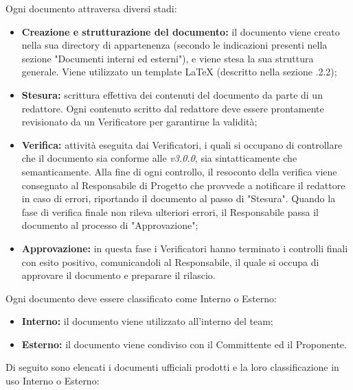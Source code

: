       Ogni documento attraversa diversi stadi:
      \begin{itemize}
        \item \textbf{Creazione e strutturazione del documento:} il documento viene creato nella sua directory di appartenenza (secondo le indicazioni presenti nella sezione "Documenti interni ed esterni"), e viene stesa la sua struttura generale. Viene utilizzato un template \LaTeX{} (descritto nella sezione .2.2);

        \item \textbf{Stesura:} scrittura effettiva dei contenuti del documento da parte di un redattore. Ogni contenuto scritto dal redattore deve essere prontamente revisionato da un Verificatore per garantirne la validità;

        \item \textbf{Verifica:} attività eseguita dai Verificatori, i quali si occupano di controllare che il documento sia conforme alle
        \textit{\NdP{} v3.0.0}, sia sintatticamente che semanticamente. Alla fine di ogni controllo, il resoconto della verifica viene consegnato al Responsabile di Progetto che provvede a notificare il redattore in caso di errori, riportando il documento al passo di "Stesura". Quando la fase di verifica finale non rileva ulteriori errori, il Responsabile passa il documento al processo di "Approvazione";

        \item \textbf{Approvazione:} in questa fase i Verificatori hanno terminato i controlli finali con esito positivo, comunicandoli al Responsabile, il quale si occupa di approvare il documento e preparare il rilascio.
      \end{itemize}
  	Ogni documento deve essere classificato come Interno o Esterno:
  	\begin{itemize}
  		\item \textbf{Interno:} il documento viene utilizzato all'interno del team;
  		\item \textbf{Esterno:} il documento viene condiviso con il Committente ed il Proponente.
  	\end{itemize}
	Di seguito sono elencati i documenti ufficiali prodotti e la loro classificazione in uso Interno o Esterno:
